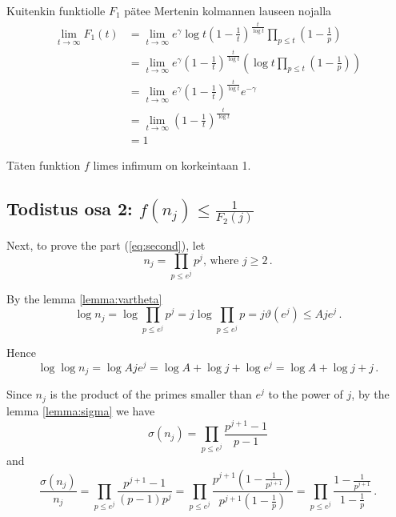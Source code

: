 \documentclass{article}
\theoremstyle{definition}
\begin{document}
Kuitenkin funktiolle $F_1$ pätee Mertenin kolmannen lauseen nojalla
\begin{align*}
    \lim_{t \rightarrow \infty} F_1(t) & = \lim_{t \rightarrow \infty} e^\gamma \log t \left(1-\frac{1}{t}\right)^\frac{t}{\log t} \prod_{p\leq t} \left(1-\frac{1}{p}\right)\\
    & = \lim_{t \rightarrow \infty} e^\gamma \left( 1-\frac{1}{t}\right)^\frac{t}{\log t} \left(\log t \prod_{p\leq t} \left(1-\frac{1}{p}\right) \right)\\
    & = \lim_{t \rightarrow \infty} e^\gamma \left( 1-\frac{1}{t}\right)^\frac{t}{\log t} e^{-\gamma}\\
    & = \lim_{t \rightarrow \infty} \left( 1-\frac{1}{t}\right)^\frac{t}{\log t}\\
    & = 1
\end{align*}

Täten funktion $f$ limes infimum on korkeintaan 1.

\subsection{Todistus osa 2: $f(n_j) \leq \frac{1}{F_2(j)}$}

Next, to prove the part (\ref{eq:second}), let
\begin{equation*}
    n_j=\prod_{p\leq e^j} p^j\text{, where } j\geq 2\,.
\end{equation*}

By the lemma \ref{lemma:vartheta}
\begin{equation*}
    \log n_j = \log \prod_{p\leq e^j} p^j = j \log \prod_{p\leq e^j} p = j\vartheta(e^j) \leq Aje^j\,.
\end{equation*}

Hence
\begin{equation}
\label{eq:lognj}
    \log \log n_j = \log Aje^j = \log A + \log j + \log e^j = \log A + \log j + j\,.
\end{equation}

Since $n_j$ is the product of the primes smaller than $e^j$ to the power of $j$, by the lemma \ref{lemma:sigma} we have
\begin{equation*}
    \sigma(n_j) = \prod_{p\leq e^j} \frac{p^{j+1}-1}{p-1}
\end{equation*}
and
\begin{equation}
\label{eq:signjpernj}
    \frac{\sigma(n_j)}{n_j} = \prod_{p\leq e^j} \frac{p^{j+1}-1}{(p-1)p^j} = \prod_{p\leq e^j} \frac{p^{j+1}\left(1-\frac{1}{p^{j+1}}\right)}{p^{j+1}\left(1-\frac{1}{p}\right)} = \prod_{p\leq e^j} \frac{1-\frac{1}{p^{j+1}}}{1-\frac{1}{p}}\,.
\end{equation}
\end{document}
